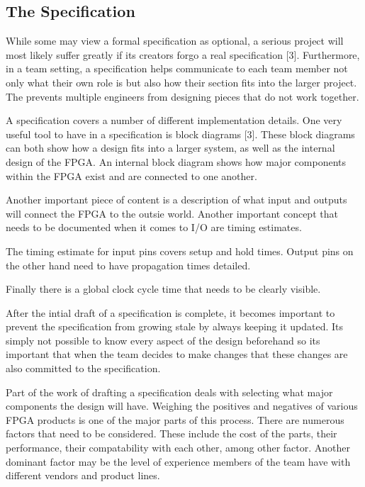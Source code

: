 \documentclass{article}
\begin{document}
    \subsection{The Specification}

    While some may view a formal specification as optional, a serious project
    will most likely suffer greatly if its creators forgo a real specification [3].
    Furthermore, in a team setting, a specification helps communicate to each team
    member not only what their own role is but also how their section fits into the
    larger project. The prevents multiple engineers from designing pieces that
    do not work together.

    A specification covers a number of different implementation details.
    One very useful tool to have in a specification is block diagrams [3].
    These block diagrams can both show how a design fits into a larger system,
    as well as the internal design of the FPGA. An internal block diagram shows
    how major components within the FPGA exist and are connected to one another.

    Another important piece of content is a description of what input and outputs
    will connect the FPGA to the outsie world. Another important concept that
    needs to be documented when it comes to I/O are timing estimates.

    The timing estimate for input pins covers setup and hold times.
    Output pins on the other hand need to have propagation times detailed.

    Finally there is a global clock cycle time that needs to be clearly visible.

    After the intial draft of a specification is complete, it becomes important
    to prevent the specification from growing stale by always keeping it updated.
    Its simply not possible to know every aspect of the design beforehand so
    its important that when the team decides to make changes that these changes
    are also committed to the specification.

    Part of the work of drafting a specification deals with selecting what major components
    the design will have. Weighing the positives and negatives of various FPGA products
    is one of the major parts of this process. There are numerous factors that need to be
    considered. These include the cost of the parts, their performance, their compatability
    with each other, among other factor. Another dominant factor may be
    the level of experience members of the team have with different vendors and product lines.
\end{document}

